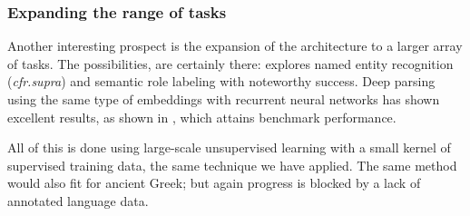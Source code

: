 \subsubsection{Expanding the range of tasks}
\label{sec:expand}
Another interesting prospect is the expansion of the architecture to a
larger array of tasks. The possibilities, are certainly there:
\cite{collobert-2011} explores named entity recognition
(\textit{cfr.supra}) and semantic role labeling with noteworthy
success. Deep parsing using the same type of embeddings with recurrent
neural networks has shown excellent results, as shown in
\cite{collobert2011deep}, which attains benchmark performance. 

All of this is done using large-scale unsupervised learning with a
small kernel of supervised training data, the same technique we have
applied. The same method would also fit for ancient Greek; but again
progress is blocked by a lack of annotated language data. 





